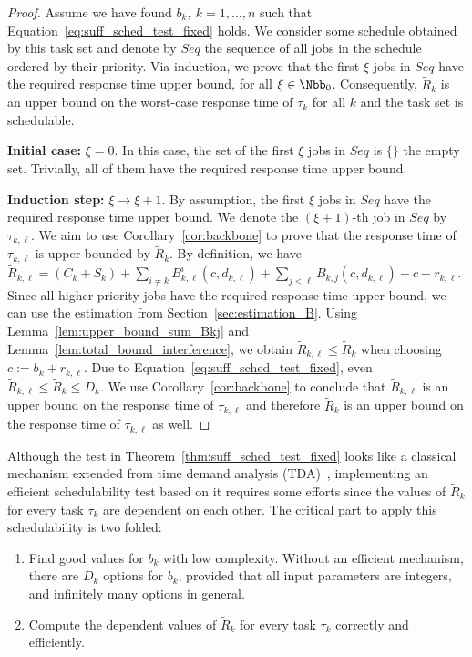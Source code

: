 \documentclass[conference]{IEEEtran}
\theoremstyle{definition}
\theoremstyle{remark}
\newcommand{\Rtilde}{\widetilde{R}}
\begin{document}
	\begin{proof}
		Assume we have found $b_k,~k=1,\dots,n$ such that Equation~\eqref{eq:suff_sched_test_fixed} holds.
		We consider some schedule obtained by this task set and denote by $Seq$ the sequence of all jobs in the schedule ordered by their priority.
		Via induction, we prove that the first $\xi$ jobs in $Seq$ have the required response time upper bound, for all $\xi \in \Nbb_0$.
		Consequently, $\Rtilde_k$ is an upper bound on the worst-case response time of $\tau_k$ for all $k$ and the task set is schedulable.
		
		\textbf{Initial case:} $\xi = 0$.
		In this case, the set of the first $\xi$ jobs in $Seq$ is $\{\}$ the empty set.
		Trivially, all of them have the required response time upper bound.
		
		\textbf{Induction step:} $\xi \to \xi+1$.
		By assumption, the first $\xi$ jobs in $Seq$ have the required response time upper bound.
		We denote the $(\xi+1)$-th job in $Seq$ by $\tau_{k,\ell}$.
		We aim to use Corollary~\ref{cor:backbone} to prove that the response time of $\tau_{k,\ell}$ is upper bounded by $\Rtilde_k$.
		By definition, we have $\Rtilde_{k,\ell} = (C_k+ S_k) + \sum_{i \neq k} B^i_{k,\ell}(c,d_{k,\ell}) + \sum_{j < \ell} B_{k,j}(c,d_{k,\ell}) + c - r_{k,\ell}$.
		Since all higher priority jobs have the required response time upper bound, we can use the estimation from Section~\ref{sec:estimation_B}.
		Using Lemma~\ref{lem:upper_bound_sum_Bkj} and Lemma~\ref{lem:total_bound_interference}, we obtain $\Rtilde_{k,\ell} \leq \Rtilde_k$ when choosing $c:= b_k+r_{k,\ell}$.
		Due to Equation~\eqref{eq:suff_sched_test_fixed}, even
		$\Rtilde_{k,\ell} \leq \Rtilde_k \leq D_k$.
		We use Corollary~\ref{cor:backbone} to conclude that $\Rtilde_{k,\ell}$ is an upper bound on the response time of $\tau_{k,\ell}$ and therefore $\Rtilde_k$ is an upper bound on the response time of $\tau_{k,\ell}$ as well.
	\end{proof}
    Although the test in Theorem~\ref{thm:suff_sched_test_fixed} looks like a classical mechanism extended from time demand analysis (TDA)~\cite{joseph86responsetimes,lehoczky89}, implementing an efficient schedulability test based on it requires some efforts since the values of $\Rtilde_k$ for every task $\tau_k$ are dependent on each other. The critical part to apply this schedulability is two folded:
	\begin{enumerate}
		\item Find good values for $b_k$ with low complexity. Without an efficient mechanism, there are $D_k$ options for $b_k$, provided that all input parameters are integers, and infinitely many options in general.
		\item Compute the dependent values of $\Rtilde_k$ for every task $\tau_k$ correctly and efficiently.
	\end{enumerate}
\end{document}
